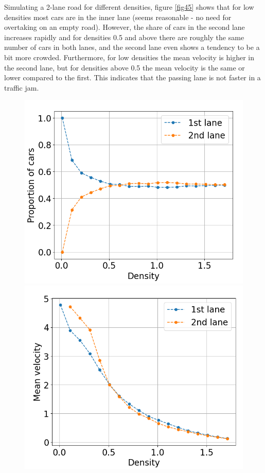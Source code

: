 \documentclass[a4paper,12pt]{article}
\begin{document}
Simulating a 2-lane road for different densities, figure \ref{fig45} shows that for low densities most cars are in the inner lane (seems reasonable - no need for overtaking on an empty road). However, the share of cars in the second lane increases rapidly and for densities 0.5 and above there are roughly the same number of cars in both lanes, and the second lane even shows a tendency to be a bit more crowded. Furthermore, for low densities the mean velocity is higher in the second lane, but for densities above 0.5 the mean velocity is the same or lower compared to the first. This indicates that the passing lane is not faster in a traffic jam. 
\begin{figure}[H]
	 \centering
    \begin{minipage}{.5\textwidth}
        \centering
        \includegraphics[scale=0.37]{fig5.png}
    \end{minipage}%
    \begin{minipage}{.5\textwidth}
        \centering
        \includegraphics[scale=0.37]{fig4.png}

\end{minipage}
\end{figure}
\end{document}
